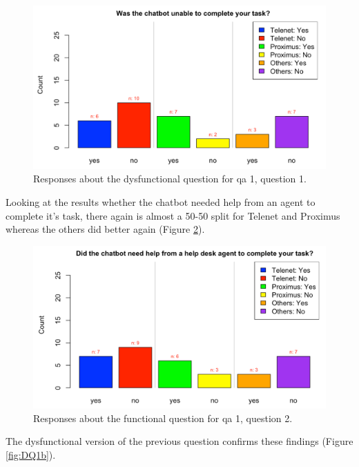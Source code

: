 \begin{figure}[!htb]
	\includegraphics[width=\linewidth, scale=0.5]{../LaTeX/Figures/Comparative/DQ1.png}
	\caption{Responses about the dysfunctional question for \acrshort{qa} 1, question 1.}\label{fig:DQ1}
\end{figure}
\break
Looking at the results whether the chatbot needed help from an agent to complete it's task, there again is almost a 50-50 split for Telenet and Proximus whereas the others did better again (Figure \ref{fig:Q1b}).\\
\begin{figure}[!htb]
	\includegraphics[width=\linewidth, scale=0.5]{../LaTeX/Figures/Comparative/Q1b.png}
	\caption{Responses about the functional question for \acrshort{qa} 1, question 2.}\label{fig:Q1b}
\end{figure}
The dysfunctional version of the previous question confirms these findings (Figure \ref{fig:DQ1b}).\\
